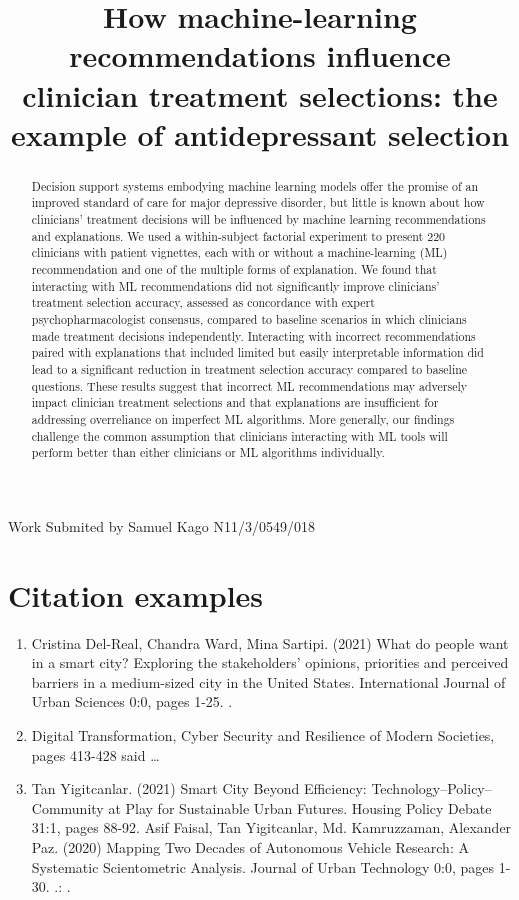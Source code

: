 \documentclass[a4paper]{article}
\title{How machine-learning recommendations influence clinician treatment selections: the example of antidepressant selection}
\author{}
\date{}
\begin{document}
\maketitle
\text Work Submited by Samuel Kago N11/3/0549/018
\begin{abstract}
Decision support systems embodying machine learning models offer the promise of an improved standard of care for major depressive disorder, but little is known about how clinicians’ treatment decisions will be influenced by machine learning recommendations and explanations. We used a within-subject factorial experiment to present 220 clinicians with patient vignettes, each with or without a machine-learning (ML) recommendation and one of the multiple forms of explanation. We found that interacting with ML recommendations did not significantly improve clinicians’ treatment selection accuracy, assessed as concordance with expert psychopharmacologist consensus, compared to baseline scenarios in which clinicians made treatment decisions independently. Interacting with incorrect recommendations paired with explanations that included limited but easily interpretable information did lead to a significant reduction in treatment selection accuracy compared to baseline questions. These results suggest that incorrect ML recommendations may adversely impact clinician treatment selections and that explanations are insufficient for addressing overreliance on imperfect ML algorithms. More generally, our findings challenge the common assumption that clinicians interacting with ML tools will perform better than either clinicians or ML algorithms individually.
\end{abstract}

\section*{Citation examples}

\begin{enumerate}
\item 
Cristina Del-Real, Chandra Ward, Mina Sartipi. (2021) What do people want in a smart city? Exploring the stakeholders’ opinions, priorities and perceived barriers in a medium-sized city in the United States. International Journal of Urban Sciences 0:0, pages 1-25.
 \parencite{Smith:2012qr}.
\item Digital Transformation, Cyber Security and Resilience of Modern Societies, pages 413-428 \textcite{Smith:2013jd} said \dots
\item Tan Yigitcanlar. (2021) Smart City Beyond Efficiency: Technology–Policy–Community at Play for Sustainable Urban Futures. Housing Policy Debate 31:1, pages 88-92.
Asif Faisal, Tan Yigitcanlar, Md. Kamruzzaman, Alexander Paz. (2020) Mapping Two Decades of Autonomous Vehicle Research: A Systematic Scientometric Analysis. Journal of Urban Technology 0:0, pages 1-30. .: \autocite{Other:2014ab}.
\end{enumerate}

\printbibliography
\end{document}
